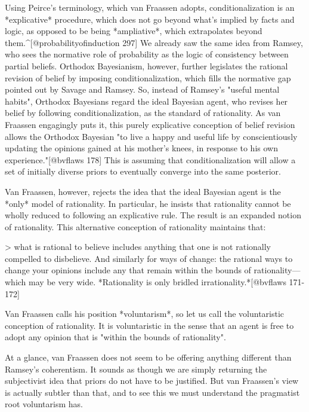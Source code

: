 Using Peirce's terminology, which van Fraassen adopts,
conditionalization is an *explicative* procedure, which does not go
beyond what's implied by facts and logic, as opposed to be being
*ampliative*, which extrapolates beyond
them.\^{}{[}@probabilityofinduction 297{]} We already saw the same idea
from Ramsey, who sees the normative role of probability as the logic of
consistency between partial beliefs. Orthodox Bayesianism, however,
further legislates the rational revision of belief by imposing
conditionalization, which fills the normative gap pointed out by Savage
and Ramsey. So, instead of Ramsey's "useful mental habits", Orthodox
Bayesians regard the ideal Bayesian agent, who revises her belief by
following conditionalization, as the standard of rationality. As van
Fraassen engagingly puts it, this purely explicative conception of
belief revision allows the Orthodox Bayesian "to live a happy and useful
life by conscientiously updating the opinions gained at his mother's
knees, in response to his own experience."{[}@bvflaws 178{]} This is
assuming that conditionalization will allow a set of initially diverse
priors to eventually converge into the same posterior.

Van Fraassen, however, rejects the idea that the ideal Bayesian agent is
the *only* model of rationality. In particular, he insists that
rationality cannot be wholly reduced to following an explicative rule.
The result is an expanded notion of rationality. This alternative
conception of rationality maintains that:

\textgreater{} what is rational to believe includes anything that one is
not rationally compelled to disbelieve. And similarly for ways of
change: the rational ways to change your opinions include any that
remain within the bounds of rationality---which may be very wide.
*Rationality is only bridled irrationality.*{[}@bvflaws 171-172{]}

Van Fraassen calls his position *voluntarism*, so let us call the
voluntaristic conception of rationality. It is voluntaristic in the
sense that an agent is free to adopt any opinion that is "within the
bounds of rationality".

At a glance, van Fraassen does not seem to be offering anything
different than Ramsey's coherentism. It sounds as though we are simply
returning the subjectivist idea that priors do not have to be justified.
But van Fraassen's view is actually subtler than that, and to see this
we must understand the pragmatist root voluntarism has.

